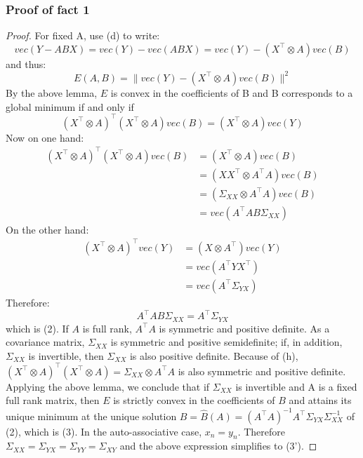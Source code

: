 \subsubsection{Proof of fact 1}
\begin{proof}
    For fixed A, use (d) to write:
    \[
        vec(Y - ABX) = vec(Y) - vec(ABX) = vec(Y) - (X^\intercal \otimes A) vec(B)
    \]
    and thus:
    \[
    E(A,B) = \|vec(Y) - (X^\intercal \otimes A) vec(B)\|^2
    \]
    By the above lemma, $E$ is convex in the coefficients of B and B corresponds to a global minimum if and only if \[
    (X^\intercal \otimes A)^\intercal (X^\intercal \otimes A) vec(B) = (X^\intercal \otimes A) vec(Y)
    \]
    Now on one hand:
    \[
    \begin{split}
         (X^\intercal \otimes A)^\intercal (X^\intercal \otimes A) vec(B) &= (X^\intercal \otimes A) vec(B)\\ &= (XX^\intercal \otimes A^\intercal A) vec(B)\\ &= (\Sigma_{XX} \otimes A^\intercal A)vec(B) \\ &= vec(A^\intercal A B\Sigma_{XX})
    \end{split}
    \]
    On the other hand:
    \[
        \begin{split}
            (X^\intercal \otimes A)^\intercal vec(Y) &= (X \otimes A^\intercal)vec(Y) \\
            &= vec(A^\intercal YX^\intercal)\\
            &= vec(A^\intercal \Sigma_{YX})
        \end{split}
    \]
    Therefore:
    \[
        A^\intercal AB\Sigma_{XX} = A^\intercal \Sigma_{YX}
    \]
    which is (2). If $A$ is full rank, $A^\intercal A$ is symmetric and positive definite. As a covariance matrix, $\Sigma_{XX}$ is symmetric and positive semidefinite; if, in addition, $\Sigma_{XX}$ is invertible, then $\Sigma_{XX}$ is also positive definite. Because of (h), $(X^\intercal  \otimes A)^\intercal (X^\intercal \otimes A) = \Sigma_{XX} \otimes A^\intercal A$ is also symmetric and positive definite. Applying the above lemma, we conclude that if $\Sigma_{XX}$ is invertible and A is a fixed full rank matrix, then $E$ is strictly convex in the coefficients of $B$ and attains its unique minimum at the unique solution $B = \hat{B}(A) = (A^\intercal A)^{-1}A^\intercal \Sigma_{YX} \Sigma_{XX}^{-1}$ of (2), which is (3). In the auto-associative case, $x_n = y_n$. Therefore $\Sigma_{XX} = \Sigma_{YX} = \Sigma_{YY} = \Sigma_{XY}$ and the above expression simplifies to (3').
    \end{proof}


